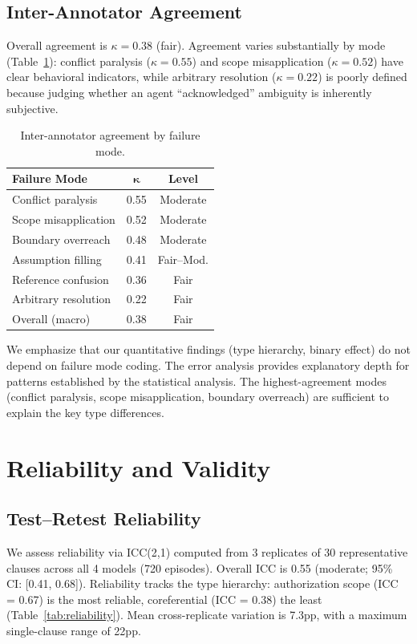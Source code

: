 \documentclass[11pt,a4paper]{article}
\begin{document}
\subsection{Inter-Annotator Agreement}

Overall agreement is $\kappa = 0.38$ (fair). Agreement varies substantially by mode (Table~\ref{tab:iaa}): conflict paralysis ($\kappa = 0.55$) and scope misapplication ($\kappa = 0.52$) have clear behavioral indicators, while arbitrary resolution ($\kappa = 0.22$) is poorly defined because judging whether an agent ``acknowledged'' ambiguity is inherently subjective.

\begin{table}[t]
\centering
\small
\begin{tabular}{@{}lcc@{}}
\toprule
\textbf{Failure Mode} & $\boldsymbol{\kappa}$ & \textbf{Level} \\
\midrule
Conflict paralysis & 0.55 & Moderate \\
Scope misapplication & 0.52 & Moderate \\
Boundary overreach & 0.48 & Moderate \\
Assumption filling & 0.41 & Fair--Mod. \\
Reference confusion & 0.36 & Fair \\
Arbitrary resolution & 0.22 & Fair \\
\midrule
Overall (macro) & 0.38 & Fair \\
\bottomrule
\end{tabular}
\caption{Inter-annotator agreement by failure mode.}
\label{tab:iaa}
\end{table}

We emphasize that our quantitative findings (type hierarchy, binary effect) do not depend on failure mode coding. The error analysis provides explanatory depth for patterns established by the statistical analysis. The highest-agreement modes (conflict paralysis, scope misapplication, boundary overreach) are sufficient to explain the key type differences.

\section{Reliability and Validity}

\subsection{Test--Retest Reliability}

We assess reliability via ICC(2,1) computed from 3 replicates of 30 representative clauses across all 4 models (720 episodes). Overall ICC is 0.55 (moderate; 95\% CI: [0.41, 0.68]). Reliability tracks the type hierarchy: authorization scope (ICC = 0.67) is the most reliable, coreferential (ICC = 0.38) the least (Table~\ref{tab:reliability}). Mean cross-replicate variation is 7.3pp, with a maximum single-clause range of 22pp.
\end{document}
